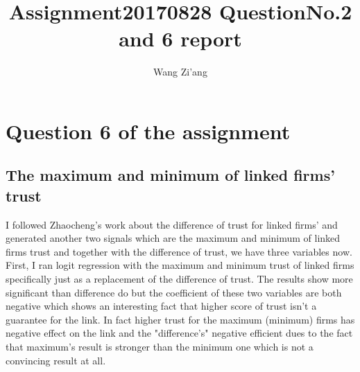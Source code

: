 \documentclass[a4paper]{article}
\title{Assignment20170828 QuestionNo.2 and 6 report}
\author{Wang Zi'ang}
\begin{document}
\maketitle

\section{Question 6 of the assignment}
\subsection{The maximum and minimum of linked firms' trust}

I followed Zhaocheng's work about the difference of trust for linked firms' and generated another two signals which are the maximum and minimum of linked firms trust and together with the difference of trust, we have three variables now. First, I ran logit regression with the maximum and minimum trust of linked firms specifically just as a replacement of the difference of trust. The results show more significant than difference do but the coefficient of these two variables are both negative which shows an interesting fact that higher score of trust isn't a guarantee for the link. In fact higher trust for the maximum (minimum) firms has negative effect on the link and the "difference's" negative efficient dues to the fact that maximum's result is stronger than the minimum one which is not a convincing result at all.
\end{document}
